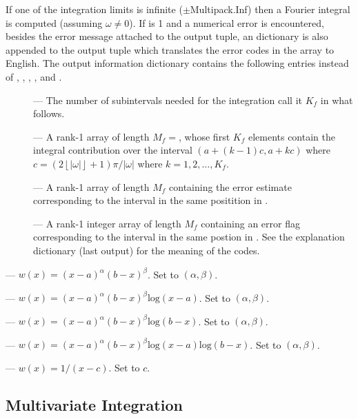 \begin{description}
If one of the integration limits is infinite ($\pm$Multipack.Inf) then
a Fourier integral is computed (assuming $\omega \neq 0$).  If
 is 1 and a numerical error is encountered, besides
the error message attached to the output tuple, an dictionary is also
appended to the output tuple which translates the error codes in the array
 to English.  The output information dictionary
contains the following entries instead of ,
, , , and .
\begin{description}
\item[] --- The number of subintervals needed for the
integration call it $K_f$ in what follows.
\item[] --- A rank-1 array of length
$M_f=$, whose first $K_f$ elements contain the integral
contribution over the interval $(a + (k-1)c, a+kc)$ where $c =
\left(2\left\lfloor\left| \omega \right| \right\rfloor+1\right) \pi /
\left| \omega \right|$ where $k = 1,2,\ldots,K_f$.
\item[] --- A rank-1 array of length $M_f$ containing
the error estimate corresponding to the interval in the same
positition in . 
\item[] --- A rank-1 integer array of length $M_f$
containing an error flag corresponding to the interval in the same
postion in .  See the explanation dictionary (last
output) for the meaning of the codes.
\end{description}

\item[\code{'alg'}] --- $w(x) = (x-a)^\alpha (b-x)^\beta$.  Set
 to $(\alpha,\beta)$.  
\item[\code{'alg-loga'}] --- $w(x) = (x-a)^\alpha (b-x)^\beta
\textrm{log}(x-a)$. Set  to $(\alpha, \beta)$.
\item[\code{'alg-logb'}] --- $w(x) = (x-a)^\alpha (b-x)^\beta
\textrm{log}(b-x)$. Set  to $(\alpha, \beta)$.
\item[\code{'alg-log'}] --- $w(x) = (x-a)^\alpha (b-x)^\beta
\textrm{log}(x-a) \textrm{log}(b-x)$. Set  to $(\alpha,
\beta)$. 

\item[\code{'cauchy'}] --- $w(x) = 1/(x-c)$.  Set  to $c$.
\end{description}

\subsection{Multivariate Integration}

